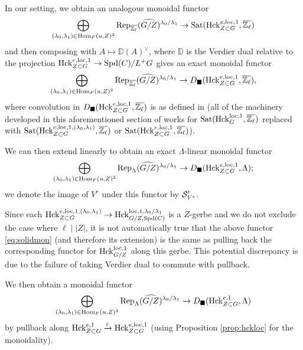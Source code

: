 In our setting, we obtain an analogous monoidal functor
\begin{equation*}
\bigoplus_{(\lambda_{0}, \lambda_{1}) \in \mathrm{Hom}_{F}(u, Z)^{2}} \textnormal{Rep}_{\overline{\mathbb{Z}_{\ell}}}(\widehat{G/Z})^{\lambda_{0}/\lambda_{1}} \to \textnormal{Sat}(\mathrm{Hck}_{Z \subset G}^{e,\mathrm{loc},1},\overline{\mathbb{Z}_{\ell}})
\end{equation*}
and then composing with $A \mapsto \mathbb{D}(A)^{\vee}$, where $\mathbb{D}$ is the Verdier dual relative to the projection $\mathrm{Hck}_{Z \subset G}^{e,\mathrm{loc},1} \to \mathrm{Spd}(C)/L^{+}G$
gives an exact monoidal functor
\begin{equation}\label{eq:solidmon}
\bigoplus_{(\lambda_{0}, \lambda_{1}) \in \mathrm{Hom}_{F}(u, Z)^{2}} \textnormal{Rep}_{\overline{\mathbb{Z}_{\ell}}}(\widehat{G/Z})^{\lambda_{0}/\lambda_{1}}  \to D_{\blacksquare}(\mathrm{Hck}_{Z \subset G}^{e,\mathrm{loc},1},\overline{\mathbb{Z}_{\ell}}),
\end{equation}
where convolution in $D_{\blacksquare}(\mathrm{Hck}_{Z \subset G}^{e,\mathrm{loc},1},\overline{\mathbb{Z}_{\ell}})$ is as defined in \cite[\S VII.5]{Geometrization} (all of the machinery developed in this aforementioned section of \cite{Geometrization} works for $\mathrm{Sat}(\mathrm{Hck}_{G}^{\mathrm{loc},1},\overline{\mathbb{Z}_{\ell}})$ replaced with $\mathrm{Sat}(\mathrm{Hck}_{Z \subset G}^{e,\mathrm{loc},1,(\lambda_{0},\lambda_{1})},\overline{\mathbb{Z}_{\ell}})$ or $\mathrm{Sat}(\mathrm{Hck}_{Z \subset G}^{e,\mathrm{loc},1},\overline{\mathbb{Z}_{\ell}})$). 

We can then extend linearly to obtain an exact $\Lambda$-linear monoidal functor
\begin{equation*}
    \bigoplus_{(\lambda_{0}, \lambda_{1}) \in \mathrm{Hom}_{F}(u, Z)^{2}} \textnormal{Rep}_{\Lambda}(\widehat{G/Z})^{\lambda_{0}/\lambda_{1}}  \to D_{\blacksquare}(\mathrm{Hck}_{Z \subset G}^{e,\mathrm{loc},1},\Lambda);
\end{equation*}
we denote the image of $V^{e}$ under this functor by $\mathcal{S}_{V^{e}}'$.

\begin{rque}
    Since each $\mathrm{Hck}_{Z \subset G}^{e,\mathrm{loc},1,(\lambda_{0},\lambda_{1})} \to \mathrm{Hck}_{G/Z,\mathrm{Spd}(C)}^{\mathrm{loc},1,\lambda_{0}/\lambda_{1}}$ is a $Z$-gerbe and we do not exclude the case where $\ell \mid |Z|$, it is not automatically true that the above functor \eqref{eq:solidmon} (and therefore its extension) is the same as pulling back the corresponding functor for $\mathrm{Hck}_{G/Z}^{\mathrm{loc},1}$ along this gerbe. This potential discrepancy is due to the failure of taking Verdier dual to commute with pullback. 
\end{rque}

We then obtain a monoidal functor
\begin{equation}\label{eq:monoidal1}
    \bigoplus_{(\lambda_{0}, \lambda_{1}) \in \mathrm{Hom}_{F}(u, Z)^{2}} \textnormal{Rep}_{\Lambda}(\widehat{G/Z})^{\lambda_{0}/\lambda_{1}}  \to D_{\blacksquare}(\mathrm{Hck}_{Z \subset G}^{e,1},\Lambda)
\end{equation}
by pullback along $\mathrm{Hck}_{Z \subset G}^{e,1} \xrightarrow{\varepsilon} \mathrm{Hck}_{Z \subset G}^{e,\mathrm{loc},1}$ (using Proposition \ref{prop:hckloc} for the monoidality).

